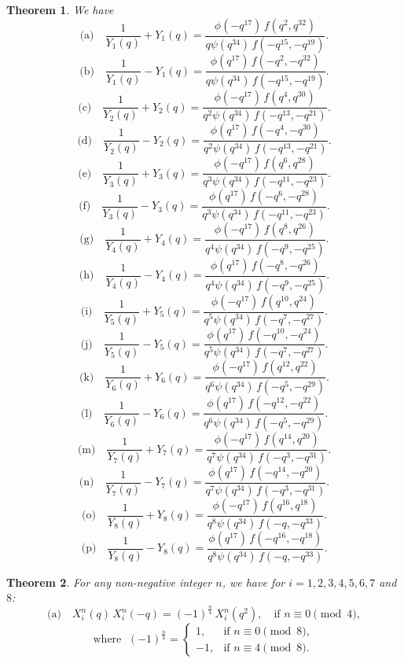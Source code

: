 \documentclass[11pt,a4paper]{article}
\numberwithin{equation}{section}
\theoremstyle{plain}
\newtheorem{theorem}{Theorem}[section]
\begin{document}
	
	\begin{theorem}
		We have
		\[
		\text{(a)}\quad 
		\frac{1}{Y_1(q)} + Y_1(q)
		= \frac{\phi(-q^{17})\, f(q^{2}, q^{32})}
		{q\psi(q^{34})\, f(-q^{15},-q^{19})}.
		\]
		\[
		\text{(b)}\quad 
		\frac{1}{Y_1(q)} - Y_1(q)
		= \frac{\phi(q^{17})\, f(-q^{2}, -q^{32})}
		{q\psi(q^{34})\, f(-q^{15},-q^{19})}.
		\]
		\[
		\text{(c)}\quad 
		\frac{1}{Y_2(q)} + Y_2(q)
		= \frac{\phi(-q^{17})\, f(q^{4}, q^{30})}
		{q^{2}\psi(q^{34})\, f(-q^{13},-q^{21})}.
		\]
		\[
		\text{(d)}\quad 
		\frac{1}{Y_2(q)} - Y_2(q)
		= \frac{\phi(q^{17})\, f(-q^{4}, -q^{30})}
		{q^{2}\psi(q^{34})\, f(-q^{13},-q^{21})}.
		\]
			\[
		\text{(e)}\quad 
		\frac{1}{Y_3(q)} + Y_3(q)
		= \frac{\phi(-q^{17})\, f(q^{6}, q^{28})}
		{q^{3}\psi(q^{34})\, f(-q^{11},-q^{23})}.
		\]
		\[
		\text{(f)}\quad 
		\frac{1}{Y_3(q)} - Y_3(q)
		= \frac{\phi(q^{17})\, f(-q^{6}, -q^{28})}
		{q^{3}\psi(q^{34})\, f(-q^{11},-q^{23})}.
		\]
		\[
		\text{(g)}\quad 
		\frac{1}{Y_4(q)} + Y_4(q)
		= \frac{\phi(-q^{17})\, f(q^{8}, q^{26})}
		{q^{4}\psi(q^{34})\, f(-q^{9},-q^{25})}.
		\]
		\[
		\text{(h)}\quad 
		\frac{1}{Y_4(q)} - Y_4(q)
		= \frac{\phi(q^{17})\, f(-q^{8}, -q^{26})}
		{q^{4}\psi(q^{34})\, f(-q^{9},-q^{25})}.
		\]
		\[
		\text{(i)}\quad 
		\frac{1}{Y_5(q)} + Y_5(q)
		= \frac{\phi(-q^{17})\, f(q^{10}, q^{24})}
		{q^{5}\psi(q^{34})\, f(-q^{7},-q^{27})}.
		\]
		\[
		\text{(j)}\quad 
		\frac{1}{Y_5(q)} - Y_5(q)
		= \frac{\phi(q^{17})\, f(-q^{10}, -q^{24})}
		{q^{5}\psi(q^{34})\, f(-q^{7},-q^{27})}.
		\]
		\[
		\text{(k)}\quad 
		\frac{1}{Y_6(q)} + Y_6(q)
		= \frac{\phi(-q^{17})\, f(q^{12}, q^{22})}
		{q^{6}\psi(q^{34})\, f(-q^{5},-q^{29})}.
		\]
		\[
		\text{(l)}\quad 
		\frac{1}{Y_6(q)} - Y_6(q)
		= \frac{\phi(q^{17})\, f(-q^{12}, -q^{22})}
		{q^{6}\psi(q^{34})\, f(-q^{5},-q^{29})}.
		\]
		\[
		\text{(m)}\quad 
		\frac{1}{Y_7(q)} + Y_7(q)
		= \frac{\phi(-q^{17})\, f(q^{14}, q^{20})}
		{q^{7}\psi(q^{34})\, f(-q^{3},-q^{31})}.
		\]
		\[
		\text{(n)}\quad 
		\frac{1}{Y_7(q)} - Y_7(q)
		= \frac{\phi(q^{17})\, f(-q^{14}, -q^{20})}
		{q^{7}\psi(q^{34})\, f(-q^{3},-q^{31})}.
		\]
		\[
		\text{(o)}\quad 
		\frac{1}{Y_8(q)} + Y_8(q)
		= \frac{\phi(-q^{17})\, f(q^{16}, q^{18})}
		{q^{8}\psi(q^{34})\, f(-q,-q^{33})}.
		\]
		\[
		\text{(p)}\quad 
		\frac{1}{Y_8(q)} - Y_8(q)
		= \frac{\phi(q^{17})\, f(-q^{16}, -q^{18})}
		{q^{8}\psi(q^{34})\, f(-q,-q^{33})}.
		\]
	\end{theorem}
	
	
	\begin{theorem}
		For any non-negative integer $n$, we have for $i=1, 2, 3, 4, 5, 6, 7$ and $8$:
		\[
		\text{(a)}\quad
		X_i^{n}(q)\,X_i^{n}(-q)
		=
		(-1)^{\frac{n}{4}}\,X_i^{n}(q^2),
		\quad \text{if } n \equiv 0 \pmod{4},
		\]
		\[
		\text{where }\;
		(-1)^{\frac{n}{4}}
		=
		\begin{cases}
			 1, & \text{if } n \equiv 0 \pmod{8},\\[4pt]
			-1, & \text{if } n \equiv 4 \pmod{8}.
		\end{cases}
		\]
	\end{theorem}
	
\end{document}
